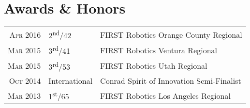 \documentclass{my_cv}
\begin{document}
\section{Awards \& Honors}
\begin{tabular}{rll}
  \textsc{Apr} 2016 & 2\textsuperscript{nd}/42 & FIRST Robotics Orange County Regional\\
  \textsc{Mar} 2015 & 3\textsuperscript{rd}/41 & FIRST Robotics Ventura Regional\\
  \textsc{Mar} 2015 & 3\textsuperscript{rd}/53 & FIRST Robotics Utah Regional\\
  \textsc{Oct} 2014 & International & Conrad Spirit of Innovation Semi-Finalist\\
  \textsc{Mar} 2013 & 1\textsuperscript{st}/65 & FIRST Robotics Los Angeles Regional\\
\end{tabular}
\end{document}
